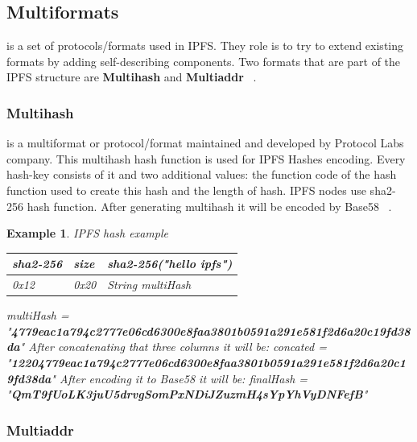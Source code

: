 \documentclass[a4paper,12pt,fleqn]{article}
\newtheorem{exmp}{Example}[subsection]
\begin{document}
\subsection{Multiformats}
 is a set of protocols/formats used in IPFS. They role is to try to extend existing formats by adding self-describing components. Two formats that are part of the IPFS structure are \textbf{Multihash} and \textbf{Multiaddr} ~\cite{multiformats}.

\subsubsection{Multihash}
 is a multiformat or protocol/format maintained and developed by Protocol Labs company. This multihash hash function is used for IPFS Hashes encoding. Every hash-key consists of it and two additional values: the function code of the hash function used to create this hash and the length of hash. IPFS nodes use sha2-256 hash function. After generating multihash it will be encoded by Base58 ~\cite{multihash}.
\begin{exmp} IPFS hash example
\begin{center}
\begin{tabu} to 0.8\textwidth { | X[c] | X[c] | X[c] | }
 \hline
 \textbf{sha2-256} & \textbf{size} & \textbf{sha2-256("hello ipfs")} \\
 \hline
 0x12  & 0x20  & String multiHash  \\
\hline
\end{tabu}
\newline
\newline
\begin{flushleft}
multiHash = "\textbf{4779eac1a794c2777e06cd6300e8faa3801b0591a291e581f2d6a20c19fd38da}"
\newline
After concatenating that three columns it will be: 
\newline
concated = "\textbf{12204779eac1a794c2777e06cd6300e8faa3801b0591a291e581f2d6a20c19fd38da}"
\newline
After encoding it to Base58 it will be:
\newline
finalHash = "\textbf{QmT9fUoLK3juU5drvgSomPxNDiJZuzmH4sYpYhVyDNFefB}"
\end{flushleft}

\end{center}
\end{exmp}

\subsubsection{Multiaddr}
\end{document}
